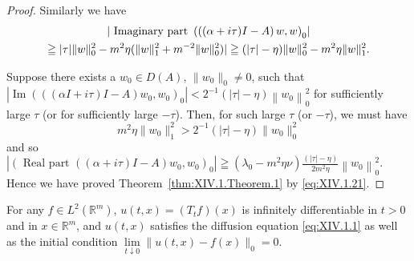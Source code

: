 \begin{proof}
Similarly we have 
\begin{gather}\left| \text{ Imaginary part } \left(\left((\alpha + i \tau) I - A\right) w, w\right) _{0} \right| \notag \\\geqq | \tau | \| w \| _{0} ^{2} - m ^{2} \eta (\| w \| _{1} ^{2} + m ^{-2} \| w \| _{0} ^{2}) | \geqq (| \tau | - \eta) \| w \| _{0} ^{2} - m ^{2} \eta \| w \| _{1} ^{2}. \notag
\end{gather}

Suppose there exists a $w_0 \in D(A)$, $\|w_0\|_0 \neq 0$, such that 
$\left|\operatorname{Im}\left(\left(\left(\alpha I+i\tau\right)I-A\right)w_{0},w_{0}\right)_{0}\right|<2^{-1}\left(\left|\tau\right|-\eta\right)\left\|w_{0}\right\|_{0}^{2}$ for sufficiently large $\tau$ (or for sufficiently large $-\tau$). Then, for such large $\tau$ (or $-\tau$), we must have 
\[
m ^{2} \eta \| w _{0} \| _{1} ^{2} > 2 ^{-1} (| \tau | - \eta) \| w _{0} \| _{0} ^{2}
\]
and so 
$\left|\left(\text{ Real part } \left(\left(\alpha+i\tau\right)I-A\right)w_{0},w_{0}\right)_{0}\right|\geqq\left(\lambda_{0}-m^{2}\eta\nu\right)\frac{\left(\left|\tau\right|-\eta\right)}{2m^{2}\eta}\left\|w_{0}\right\|_{0}^{2}.$ Hence we have proved Theorem~\ref{thm:XIV.1.Theorem.1} by \eqref{eq:XIV.1.21}. 
\end{proof}

\begin{theorem}\label{thm:XIV.1.Theorem.2} For any $f \in L^2(\mathbb{R}^{m})$, $u(t, x) = (T_t f)(x)$ is infinitely differentiable in $t > 0$ and in $x \in \mathbb{R}^{m}$, and $u(t, x)$ satisfies the diffusion equation \eqref{eq:XIV.1.1} as well as the initial condition $\lim\limits_{t \downarrow 0} \|u(t, x) - f(x)\|_0 = 0$. 
\end{theorem}

